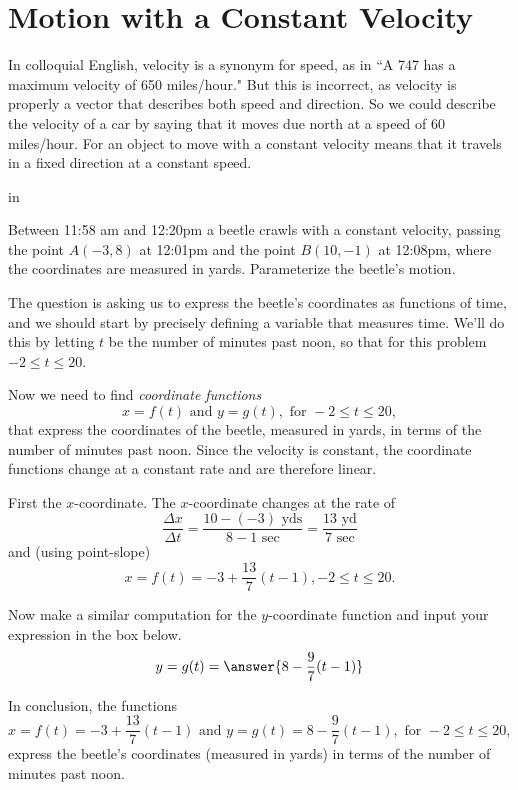 \documentclass{ximera}
\newcommand{\pskip}{\vskip 0.1 in}
\begin{document}
\section{Motion with a Constant Velocity}

In colloquial English, velocity is a synonym for speed, as in ``A 747 has a maximum velocity of 650 miles/hour." But this is incorrect, as velocity is properly a vector that describes both speed and direction. So we could describe the velocity of a car by saying that it moves due north at a speed of 60 miles/hour. For an object to move with a constant velocity means that it travels in a fixed direction at a constant speed.

\pskip

\begin{example}   \label{Ex1}
 Between 11:58 am and 12:20pm a beetle crawls with a constant velocity, passing the point $A(-3,8)$ at 12:01pm and the point $B(10,-1)$ at 12:08pm, where the coordinates are measured in yards. Parameterize the beetle's motion.
\end{example}

\begin{explanation}
The question is asking us to express the beetle's coordinates as functions of time, and we should start by precisely defining a variable that measures time. We'll do this by letting $t$ be the number of minutes past noon, so that for this problem $-2 \leq t \leq 20$. 

Now we need to find \emph{coordinate functions}
\[
   x = f(t) \text{ and } y = g(t) , \text{ for } -2\leq t \leq 20 ,
\]
that express the coordinates of the beetle, measured in yards, in terms of the number of minutes past noon.  Since the velocity is constant, the coordinate functions change at a constant rate and are therefore linear.

First the $x$-coordinate. The $x$-coordinate changes at the rate of 
\[
    \frac{\Delta x}{\Delta t} = \frac{10-(-3) \text{ yds}}{8-1 \text{ sec}} = \frac{13 \text{ yd}}{7 \text{ sec}}
\]
and (using point-slope) 
\[
     x = f(t) = -3 + \frac{13}{7}(t-1) , -2\leq t \leq 20 .
\]


\begin{question} 
Now make a similar computation for the $y$-coordinate function and input your expression in the box below. 
\[
 y=g(t) =  \answer{8-\frac{9}{7}(t-1)} 
\]
    \end{question}

In conclusion, the functions
\[
    x = f(t) = -3 + \frac{13}{7}(t-1) \text{ and }  y=g(t) = 8-\frac{9}{7}(t-1) , \text{ for } -2\leq t \leq 20 ,
\]
express the beetle's coordinates (measured in yards) in terms of the number of minutes past noon.

\end{explanation}
\end{document}
